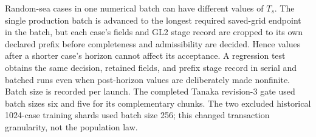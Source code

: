 \documentclass[11pt]{article}
\begin{document}
Random-sea cases in one numerical batch can have different values of $T_s$.
The single production batch is advanced to the longest required saved-grid
endpoint in the batch, but each case's fields and GL2 stage record are cropped
to its own declared prefix before completeness and admissibility are decided.
Hence values after a shorter case's horizon cannot affect its acceptance.  A
regression test obtains the same decision, retained fields, and prefix stage
record in serial and batched runs even when post-horizon values are
deliberately made nonfinite.  Batch size is recorded per launch.  The completed
Tanaka revision-3 gate used batch sizes six and five for its complementary
chunks.  The two excluded historical 1024-case training shards used batch
size 256; this changed transaction granularity, not the population law.
\end{document}
